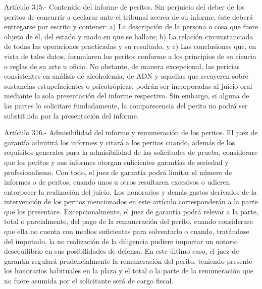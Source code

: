     Artículo 315.- Contenido del informe de peritos. Sin perjuicio del deber de los peritos de concurrir a declarar ante el tribunal acerca de su informe, éste deberá entregarse por escrito y contener:
    a) La descripción de la persona o cosa que fuere
objeto de él, del estado y modo en que se hallare;
    b) La relación circunstanciada de todas las
operaciones practicadas y su resultado, y
    c) Las conclusiones que, en vista de tales datos,
formularen los peritos conforme a los principios de su
ciencia o reglas de su arte u oficio.
    No obstante, de manera excepcional, las pericias
consistentes en análisis de alcoholemia, de ADN y
aquellas que recayeren sobre sustancias estupefacientes
o psicotrópicas, podrán ser incorporadas al juicio oral
mediante la sola presentación del informe respectivo.
Sin embargo, si alguna de las partes lo solicitare
fundadamente, la comparecencia del perito no podrá ser
substituida por la presentación del informe.

    Artículo 316.- Admisibilidad del informe y remuneración de los peritos. El juez de garantía admitirá los informes y citará a los peritos cuando, además de los requisitos generales para la admisibilidad de las solicitudes de prueba, considerare que los peritos y sus informes otorgan suficientes garantías de seriedad y profesionalismo. Con todo, el juez de garantía podrá limitar el número de informes o de peritos, cuando unos u otros resultaren excesivos o udieren entorpecer la realización del juicio.
    Los honorarios y demás gastos derivados de la intervención de los peritos mencionados en este artículo corresponderán a la parte que los presentare.
    Excepcionalmente, el juez de garantía podrá relevar a la parte, total o parcialmente, del pago de la remuneración del perito, cuando considerare que ella no cuenta con medios suficientes para solventarlo o cuando, tratándose del imputado, la no realización de la diligencia pudiere importar un notorio desequilibrio en sus posibilidades de defensa. En este último caso, el juez de garantía regulará prudencialmente la remuneración del perito, teniendo presente los honorarios habituales en la plaza y el total o la parte de la remuneración que no fuere asumida por el solicitante será de cargo fiscal.

